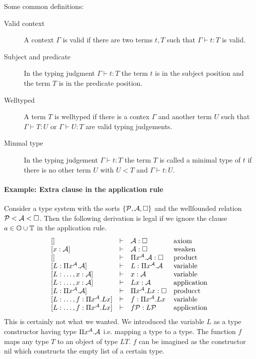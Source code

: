 \begin{definition}
  Some common definitions:
  \begin{description}
  \item[Valid context] A context $\Gamma$ is valid if there are two terms
    $t,T$ such that $\Gamma \vdash t : T$ is valid.

  \item[Subject and predicate] In the typing judgment $\Gamma \vdash t : T$
    the term $t$ is in the subject position and the term $T$ is in the
    predicate position.

  \item[Welltyped] A term $T$ is welltyped if there is a contex $\Gamma$ and
    another term $U$ such that $\Gamma \vdash T:U$ or $\Gamma \vdash U:T$ are
    valid typing judgements.

  \item[Minmal type] In the typing judgement $\Gamma \vdash t : T$ the term
    $T$ is called a minimal type of $t$ if there is no other term $U$ with $U
    < T$ and $\Gamma \vdash t :U$.
  \end{description}
\end{definition}

\paragraph{Example: Extra clause in the application rule}
Consider a type system with the sorts $\{{\cal P},{\cal A},\Box\}$ and the
wellfounded relation ${\cal P} < {\cal A} < \Box$. Then the following derivation is
legal if we ignore the clause $a \in \mathbb{O} \cup \mathbb{T}$ in the application
rule.
%
$$
%
\begin{array}{llll}
  []       & \vdash & \Any : \Box                 & \text{axiom}
  \cr
  [x:\Any] & \vdash & \Any : \Box                 & \text{weaken}
  \cr
  []       & \vdash & \Pi x^{\Any} . \Any : \Box  & \text{product}
  \cr
  [L:\Pi x^{\Any}.\Any]& \vdash & L : \Pi x^{\Any}.\Any  & \text{variable}
  \cr
  [L:\dots, x: \Any]& \vdash & x: \Any            & \text{variable}
  \cr
  [L:\dots, x: \Any]& \vdash & L x: \Any          & \text{application}
  \cr
  [L:\Pi x^{\Any}.\Any]& \vdash & \Pi x^{\Any}. L x: \Box  & \text{producct}
  \cr
  [L:\dots, f: \Pi x^{\Any}. L x]& \vdash & f: \Pi x^{\Any}.L x & \text{variable}
  \cr
  [L:\dots, f: \Pi x^{\Any}. L x]& \vdash & f {\Prop}: L \Prop & \text{application}
\end{array}
$$
%
This is certainly not what we wanted. We introduced the variable $L$ as a
type constructor having type $\Pi x^{\cal A}. {\cal A}$ i.e. mapping a type to a
type. The function $f$ maps any type $T$ to an object of type $L T$. $f$ can
be imagined as the constructor $\text{nil}$ which constructs the empty list of
a certain type.

